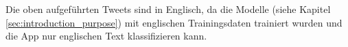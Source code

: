 Die oben aufgef{\"u}hrten Tweets sind in Englisch, da die Modelle (siehe Kapitel \ref{sec:introduction_purpose}) mit englischen Trainingsdaten trainiert wurden und die App nur englischen Text klassifizieren kann.                                                                                                                                                                                                                                                                                                                                                                                                                                                                                                                                                                                                                                                                                                                                                                                                                                                                                                                                                                                                                                                                                                                                                                                                                                                                                                                                                                                                                                                                                                                                                                                                                                                                                                                                                                                                                                                                                                                                                                                                                                                                                                                                                                                                                                                                                                                                                                                                                                                                                                                                                                                                                                                                                                                                                                                                                                                                                                                                                                                                                                                                                                                                                                                                                                                    